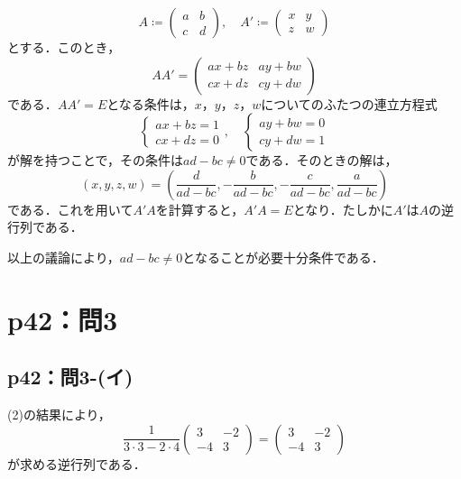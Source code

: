 \documentclass[a4paper,10pt,fleqn]{ltjsarticle}
\begin{document}
\begin{leftbar}
  \[
    A \coloneqq \begin{pmatrix} a & b \\ c & d \end{pmatrix},\quad A' \coloneqq \begin{pmatrix} x & y \\ z & w \end{pmatrix}
  \]
  とする．このとき，
  \[
    A A' = \begin{pmatrix} a x + b z & ay + bw \\ cx + dz & cy +dw \end{pmatrix}
  \]
  である．$AA'=E$となる条件は，$x$，$y$，$z$，$w$についてのふたつの連立方程式
  \[
    \begin{cases}
      ax+bz =1 \\
      cx+dz =0
    \end{cases}
    ,\quad
    \begin{cases}
      ay+bw=0 \\
      cy+dw=1
    \end{cases}
  \]
  が解を持つことで，その条件は$ad-bc \ne 0$である．そのときの解は，
  \[
    (x,y,z,w)=  (\frac{d}{ad-bc},-\frac{b}{ad-bc},-\frac{c}{ad-bc},\frac{a}{ad-bc})
  \]
  である．これを用いて$A'A$を計算すると，$A' A =E$となり．たしかに$A'$は$A$の逆行列である．

  以上の議論により，$ad - bc \ne 0$となることが必要十分条件である．
\end{leftbar}

\section*{p42：問3}

\subsection*{p42：問3-(イ)}

\begin{leftbar}
  (2)の結果により，
  \[
    \frac{1}{3 \cdot 3 - 2 \cdot 4} \begin{pmatrix} 3 & -2 \\ -4 & 3 \end{pmatrix} =  \begin{pmatrix} 3 & -2 \\ -4 & 3 \end{pmatrix}
  \]
  が求める逆行列である．
\end{leftbar}
\end{document}
